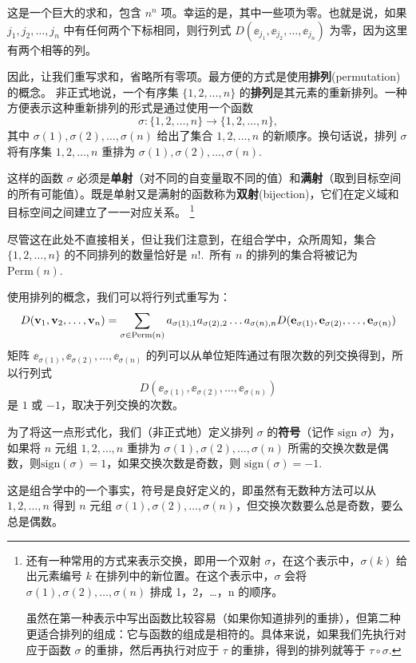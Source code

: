 这是一个巨大的求和，包含 $n^n$ 项。幸运的是，其中一些项为零。也就是说，如果 $j_1, j_2, \dots, j_n$ 中有任何两个下标相同，则行列式 $D(\ee_{j_1}, \ee_{j_2}, \dots, \ee_{j_n})$ 为零，因为这里有两个相等的列。

因此，让我们重写求和，省略所有零项。最方便的方式是使用\textbf{排列}(permutation)的概念。
非正式地说，一个有序集 $\{1, 2, \dots, n\}$ 的\textbf{排列}是其元素的重新排列。一种方便表示这种重新排列的形式是通过使用一个函数
$$\sigma: \{1, 2, \dots, n\} \to \{1, 2, \dots, n\},$$
其中 $\sigma(1), \sigma(2), \dots, \sigma(n)$ 给出了集合 $1, 2, \dots, n$ 的新顺序。换句话说，排列 $\sigma$ 将有序集 $1, 2, \dots, n$ 重排为 $\sigma(1), \sigma(2), \dots, \sigma(n)$.~

这样的函数 $\sigma$ 必须是\textbf{单射}（对不同的自变量取不同的值）和\textbf{满射}（取到目标空间的所有可能值）。既是单射又是满射的函数称为\textbf{双射}(bijection)，它们在定义域和目标空间之间建立了一一对应关系。
\footnote{
还有一种常用的方式来表示交换，即用一个双射 \(\sigma\)，在这个表示中，\(\sigma(k)\) 给出元素编号 \(k\) 在排列中的新位置。在这个表示中，\(\sigma\) 会将 \(\sigma(1), \sigma(2), \ldots, \sigma(n)\) 排成 1，2，…，n 的顺序。

虽然在第一种表示中写出函数比较容易（如果你知道排列的重排），但第二种更适合排列的组成：它与函数的组成是相符的。具体来说，如果我们先执行对应于函数 \(\sigma\) 的重排，然后再执行对应于 \(\tau\) 的重排，得到的排列就等于 \(\tau \circ \sigma\).
}

尽管这在此处不直接相关，但让我们注意到，在组合学中，众所周知，集合 $\{1, 2, \dots, n\}$ 的不同排列的数量恰好是 $n!$.~所有 $n$ 的排列的集合将被记为 $\text{Perm}(n)$.~


使用排列的概念，我们可以将行列式重写为：
$$
D(\mathbf{v}_1, \mathbf{v}_2, \dots, \mathbf{v}_n) = \sum_{\sigma \in \text{Perm}(n)} a_{\sigma(1),1} a_{\sigma(2),2} \dots a_{\sigma(n),n} D(\mathbf{e}_{\sigma(1)}, \mathbf{e}_{\sigma(2)}, \dots, \mathbf{e}_{\sigma(n)})
$$
矩阵 $\ee_{\sigma(1)}, \ee_{\sigma(2)}, \dots, \ee_{\sigma(n)}$ 的列可以从单位矩阵通过有限次数的列交换得到，所以行列式
$$D(\ee_{\sigma(1)}, \ee_{\sigma(2)}, \dots, \ee_{\sigma(n)})$$
是 $1$ 或 $-1$，取决于列交换的次数。

为了将这一点形式化，我们（非正式地）定义排列 $\sigma$ 的\textbf{符号}（记作 $\text{sign } \sigma$）为，如果将 $n$ 元组 $1, 2, \dots, n$ 重排为 $\sigma(1), \sigma(2), \dots, \sigma(n)$ 所需的交换次数是偶数，则$\text{sign}(\sigma) = 1$，如果交换次数是奇数，则 $\text{sign}(\sigma) = -1$.~

这是组合学中的一个事实，符号是良好定义的，即虽然有无数种方法可以从 $1, 2, \dots, n$ 得到 $n$ 元组 $\sigma(1), \sigma(2), \dots, \sigma(n)$，但交换次数要么总是奇数，要么总是偶数。

